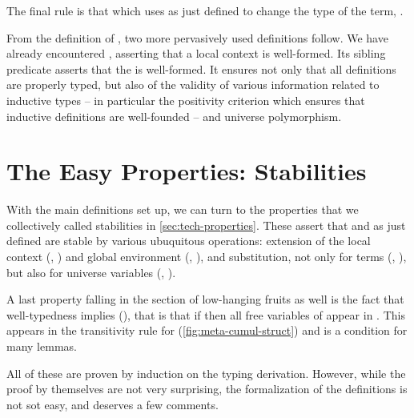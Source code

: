 The final rule is that which uses  as just defined
to change the type of the term, \eg {}.

From the definition of , two more pervasively used definitions
follow. We have already encountered ,
asserting that a local context is well-formed.
Its sibling predicate %
asserts that the  is well-formed. It ensures not only that all definitions
are properly typed, but also of the validity of various information
related to inductive types – in particular the positivity criterion which ensures that inductive
definitions are well-founded – and universe polymorphism.

\section[Stabilities]{The Easy Properties: Stabilities}
\label{sec:meta-stabilities}

With the main definitions set up, we can turn to the properties that we collectively called
stabilities in \cref{sec:tech-properties}. These assert that  and 
as just defined are stable by various ubuquitous operations: extension of the local context
(, ) and global
environment (, ),
and substitution, not only for terms (, ),
but also for universe variables
(, ).

A last property falling in the section of low-hanging fruits as well
is the fact that well-typedness implies
 (), that is that if 
then all free variables of  appear in . This  appears
in the transitivity rule for  (\cref{fig:meta-cumul-struct}) and is a
condition for many lemmas.

All of these are proven by induction on the typing derivation.
However, while the proof by themselves are not very surprising, the formalization of the definitions
is not sot easy, and deserves a few comments.

